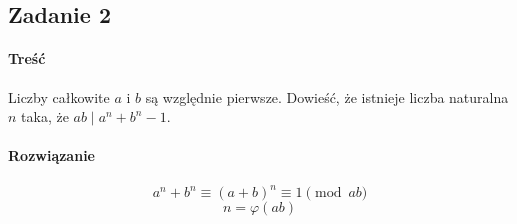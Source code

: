 \documentclass [a4paper, 10pt]{article}
\begin{document}
    \subsection{Zadanie 2} %
    \label{sub:zadanie_2}
        \paragraph{Treść}
        Liczby całkowite $a$ i $b$ są względnie pierwsze. Dowieść, że istnieje liczba naturalna $n$ taka, że $ab\mid a^n+b^n-1$.
        \paragraph{Rozwiązanie}
        \[
            a^n + b^n \equiv (a+b)^n \equiv 1\pmod {ab}
        \]
        \[
            n = \varphi(ab)
        \]
\end{document}
